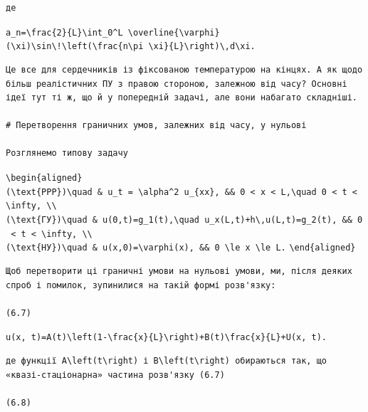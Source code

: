 \documentclass[
  ukrainian,
]{article}
\begin{document}
\begin{verbatim}
де
\end{verbatim}

\texttt{a\_n=\textbackslash{}frac\{2\}\{L\}\textbackslash{}int\_0\^{}L\ \textbackslash{}overline\{\textbackslash{}varphi\}(\textbackslash{}xi)\textbackslash{}sin\textbackslash{}!\textbackslash{}left(\textbackslash{}frac\{n\textbackslash{}pi\ \textbackslash{}xi\}\{L\}\textbackslash{}right)\textbackslash{},d\textbackslash{}xi.}

\begin{verbatim}
Це все для сердечників із фіксованою температурою на кінцях. А як щодо більш реалістичних ПУ з правою стороною, залежною від часу? Основні ідеї тут ті ж, що й у попередній задачі, але вони набагато складніші.

# Перетворення граничних умов, залежних від часу, у нульові

Розглянемо типову задачу
\end{verbatim}

\texttt{\textbackslash{}begin\{aligned\}}
\texttt{(\textbackslash{}text\{PPP\})\textbackslash{}quad\ \&\ u\_t\ =\ \textbackslash{}alpha\^{}2\ u\_\{xx\},\ \&\&\ 0\ \textless{}\ x\ \textless{}\ L,\textbackslash{}quad\ 0\ \textless{}\ t\ \textless{}\ \textbackslash{}infty,\ \textbackslash{}\textbackslash{}}
\texttt{(\textbackslash{}text\{ГУ\})\textbackslash{}quad\ \&\ u(0,t)=g\_1(t),\textbackslash{}quad\ u\_x(L,t)+h\textbackslash{},u(L,t)=g\_2(t),\ \&\&\ 0\ \textless{}\ t\ \textless{}\ \textbackslash{}infty,\ \textbackslash{}\textbackslash{}}
\texttt{(\textbackslash{}text\{НУ\})\textbackslash{}quad\ \&\ u(x,0)=\textbackslash{}varphi(x),\ \&\&\ 0\ \textbackslash{}le\ x\ \textbackslash{}le\ L.}
\texttt{\textbackslash{}end\{aligned\}}

\begin{verbatim}
Щоб перетворити ці граничні умови на нульові умови, ми, після деяких спроб і помилок, зупинилися на такій формі розв'язку:

(6.7)
\end{verbatim}

\texttt{u(x,\ t)=A(t)\textbackslash{}left(1-\textbackslash{}frac\{x\}\{L\}\textbackslash{}right)+B(t)\textbackslash{}frac\{x\}\{L\}+U(x,\ t).}

\begin{verbatim}
де функції A\left(t\right) і B\left(t\right) обираються так, що «квазі-стаціонарна» частина розв'язку (6.7)

(6.8)
\end{verbatim}
\end{document}
